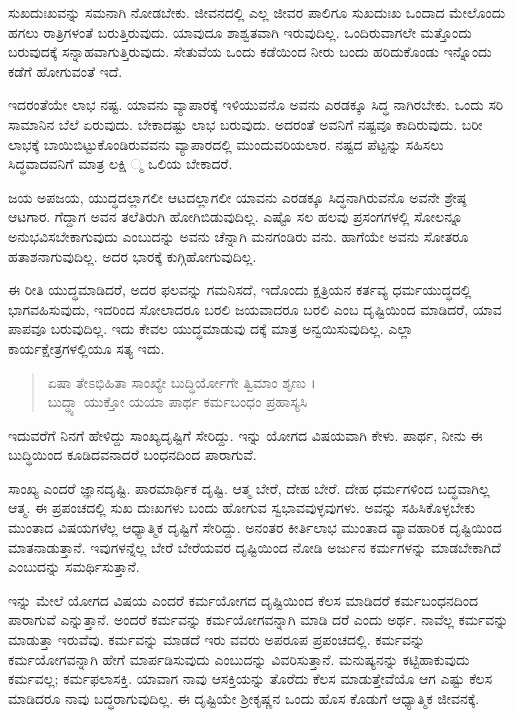 ಸುಖದುಃಖವನ್ನು ಸಮನಾಗಿ ನೋಡಬೇಕು. ಜೀವನದಲ್ಲಿ ಎಲ್ಲ ಜೀವರ ಪಾಲಿಗೂ ಸುಖದುಃಖ ಒಂದಾದ ಮೇಲೊಂದು ಹಗಲು ರಾತ್ರಿಗಳಂತೆ ಬರುತ್ತಿರುವುದು. ಯಾವುದೂ ಶಾಶ್ವತವಾಗಿ ಇರುವುದಿಲ್ಲ. ಒಂದಿರುವಾಗಲೇ ಮತ್ತೊಂದು ಬರುವುದಕ್ಕೆ ಸನ್ನಾಹವಾಗುತ್ತಿರುವುದು. ಸೇತುವೆಯ ಒಂದು ಕಡೆಯಿಂದ ನೀರು ಬಂದು ಹರಿದುಕೊಂಡು ಇನ್ನೊಂದು ಕಡೆಗೆ ಹೋಗುವಂತೆ ಇದೆ.

ಇದರಂತೆಯೇ ಲಾಭ ನಷ್ಟ. ಯಾವನು ವ್ಯಾಪಾರಕ್ಕೆ ಇಳಿಯುವನೊ ಅವನು ಎರಡಕ್ಕೂ ಸಿದ್ಧ ನಾಗಿರಬೇಕು. ಒಂದು ಸರಿ ಸಾಮಾನಿನ ಬೆಲೆ ಏರುವುದು. ಬೇಕಾದಷ್ಟು ಲಾಭ ಬರುವುದು. ಅದರಂತೆ ಅವನಿಗೆ ನಷ್ಟವೂ ಕಾದಿರುವುದು. ಬರೀ ಲಾಭಕ್ಕೆ ಬಾಯಿಬಿಟ್ಟುಕೊಂಡಿರುವವನು ವ್ಯಾಪಾರದಲ್ಲಿ ಮುಂದುವರಿಯಲಾರ. ನಷ್ಟದ ಪೆಟ್ಟನ್ನು ಸಹಿಸಲು ಸಿದ್ಧವಾದವನಿಗೆ ಮಾತ್ರ ಲಕ್ಷಿ ್ಮ ಒಲಿಯ ಬೇಕಾದರೆ.

ಜಯ ಅಪಜಯ, ಯುದ್ಧದಲ್ಲಾಗಲೀ ಆಟದಲ್ಲಾಗಲೀ ಯಾವನು ಎರಡಕ್ಕೂ ಸಿದ್ಧನಾಗಿರುವನೊ ಅವನೇ ಶ್ರೇಷ್ಠ ಆಟಗಾರ. ಗೆದ್ದಾಗ ಅವನ ತಲೆತಿರುಗಿ ಹೋಗಿಬಿಡುವುದಿಲ್ಲ. ಎಷ್ಟೊ ಸಲ ಹಲವು ಪ್ರಸಂಗಗಳಲ್ಲಿ ಸೋಲನ್ನೂ ಅನುಭವಿಸಬೇಕಾಗುವುದು ಎಂಬುದನ್ನು ಅವನು ಚೆನ್ನಾಗಿ ಮನಗಂಡಿರು ವನು. ಹಾಗೆಯೇ ಅವನು ಸೋತರೂ ಹತಾಶನಾಗುವುದಿಲ್ಲ. ಅದರ ಭಾರಕ್ಕೆ ಕುಗ್ಗಿಹೋಗುವುದಿಲ್ಲ.

ಈ ರೀತಿ ಯುದ್ಧಮಾಡಿದರೆ, ಅದರ ಫಲವನ್ನು ಗಮನಿಸದೆ, ಇದೊಂದು ಕ್ಷತ್ರಿಯನ ಕರ್ತವ್ಯ ಧರ್ಮಯುದ್ಧದಲ್ಲಿ ಭಾಗವಹಿಸುವುದು, ಇದರಿಂದ ಸೋಲಾದರೂ ಬರಲಿ ಜಯವಾದರೂ ಬರಲಿ ಎಂಬ ದೃಷ್ಟಿಯಿಂದ ಮಾಡಿದರೆ, ಯಾವ ಪಾಪವೂ ಬರುವುದಿಲ್ಲ. ಇದು ಕೇವಲ ಯುದ್ಧಮಾಡುವು ದಕ್ಕೆ ಮಾತ್ರ ಅನ್ವಯಿಸುವುದಿಲ್ಲ. ಎಲ್ಲಾ ಕಾರ್ಯಕ್ಷೇತ್ರಗಳಲ್ಲಿಯೂ ಸತ್ಯ ಇದು.

\begin{verse}
ಏಷಾ ತೇಽಭಿಹಿತಾ ಸಾಂಖ್ಯೇ ಬುದ್ಧಿರ್ಯೋಗೇ ತ್ವಿಮಾಂ ಶೃಣು ।\\ಬುದ್ಧ್ಯಾ ಯುಕ್ತೋ ಯಯಾ ಪಾರ್ಥ ಕರ್ಮಬಂಧಂ ಪ್ರಹಾಸ್ಯಸಿ 
\end{verse}

{\small ಇದುವರೆಗೆ ನಿನಗೆ ಹೇಳಿದ್ದು ಸಾಂಖ್ಯದೃಷ್ಟಿಗೆ ಸೇರಿದ್ದು. ಇನ್ನು ಯೋಗದ ವಿಷಯವಾಗಿ ಕೇಳು. ಪಾರ್ಥ, ನೀನು ಈ ಬುದ್ಧಿಯಿಂದ ಕೂಡಿದವನಾದರೆ ಬಂಧನದಿಂದ ಪಾರಾಗುವೆ.}

ಸಾಂಖ್ಯ ಎಂದರೆ ಜ್ಞಾನದೃಷ್ಟಿ. ಪಾರಮಾರ್ಥಿಕ ದೃಷ್ಟಿ. ಆತ್ಮ ಬೇರೆ, ದೇಹ ಬೇರೆ. ದೇಹ ಧರ್ಮಗಳಿಂದ ಬದ್ಧವಾಗಿಲ್ಲ ಆತ್ಮ. ಈ ಪ್ರಪಂಚದಲ್ಲಿ ಸುಖ ದುಃಖಗಳು ಬಂದು ಹೋಗುವ ಸ್ವಭಾವವುಳ್ಳವುಗಳು. ಅವನ್ನು ಸಹಿಸಿಕೊಳ್ಳಬೇಕು ಮುಂತಾದ ವಿಷಯಗಳೆಲ್ಲ ಆಧ್ಯಾತ್ಮಿಕ ದೃಷ್ಟಿಗೆ ಸೇರಿದ್ದು. ಅನಂತರ ಕೀರ್ತಿಲಾಭ ಮುಂತಾದ ವ್ಯಾವಹಾರಿಕ ದೃಷ್ಟಿಯಿಂದ ಮಾತನಾಡುತ್ತಾನೆ. ಇವುಗಳನ್ನೆಲ್ಲ ಬೇರೆ ಬೇರೆಯವರ ದೃಷ್ಟಿಯಿಂದ ನೋಡಿ ಅರ್ಜುನ ಕರ್ಮಗಳನ್ನು ಮಾಡಬೇಕಾಗಿದೆ ಎಂಬುದನ್ನು ಸಮರ್ಥಿಸುತ್ತಾನೆ.

ಇನ್ನು ಮೇಲೆ ಯೋಗದ ವಿಷಯ ಎಂದರೆ ಕರ್ಮಯೋಗದ ದೃಷ್ಟಿಯಿಂದ ಕೆಲಸ ಮಾಡಿದರೆ ಕರ್ಮಬಂಧನದಿಂದ ಪಾರಾಗುವೆ ಎನ್ನುತ್ತಾನೆ. ಅಂದರೆ ಕರ್ಮವನ್ನು ಕರ್ಮಯೋಗವನ್ನಾಗಿ ಮಾಡಿ ದರೆ ಎಂದು ಅರ್ಥ. ನಾವೆಲ್ಲ ಕರ್ಮವನ್ನು ಮಾಡುತ್ತಾ ಇರುವೆವು. ಕರ್ಮವನ್ನು ಮಾಡದೆ ಇರು ವವರು ಅಪರೂಪ ಪ್ರಪಂಚದಲ್ಲಿ. ಕರ್ಮವನ್ನು ಕರ್ಮಯೋಗವನ್ನಾಗಿ ಹೇಗೆ ಮಾರ್ಪಡಿಸುವುದು ಎಂಬುದನ್ನು ವಿವರಿಸುತ್ತಾನೆ. ಮನುಷ್ಯನನ್ನು ಕಟ್ಟಿಹಾಕುವುದು ಕರ್ಮವಲ್ಲ; ಕರ್ಮಫಲಾಸಕ್ತಿ. ಯಾವಾಗ ನಾವು ಆಸಕ್ತಿಯನ್ನು ತೊರೆದು ಕೆಲಸ ಮಾಡುತ್ತೇವೆಯೊ ಆಗ ಎಷ್ಟು ಕೆಲಸ ಮಾಡಿದರೂ ನಾವು ಬದ್ಧರಾಗುವುದಿಲ್ಲ. ಈ ದೃಷ್ಟಿಯೇ ಶ್ರೀಕೃಷ್ಣನ ಒಂದು ಹೊಸ ಕೊಡುಗೆ ಆಧ್ಯಾತ್ಮಿಕ ಜೀವನಕ್ಕೆ.

